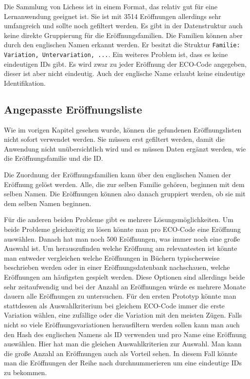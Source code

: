 Die Sammlung von Lichess ist in einem Format, das relativ gut für eine Lernanwendung geeignet ist. Sie ist mit 3514 Eröffnungen allerdings sehr umfangreich und sollte noch gefiltert werden. Es gibt in der Datenstruktur auch keine direkte Gruppierung für die Eröffnungsfamilien. Die Familien können aber durch den englischen Namen erkannt werden. Er besitzt die Struktur \lstinline{Familie: Variation, Untervariation, ...}. Ein weiteres Problem ist, dass es keine eindeutigen IDs gibt. Es wird zwar zu jeder Eröffnung der ECO-Code angegeben, dieser ist aber nicht eindeutig. Auch der englische Name erlaubt keine eindeutige Identifikation. 

\subsection{Angepasste Eröffnungsliste}
\label{cp:opening list}
Wie im vorigen Kapitel gesehen wurde, können die gefundenen Eröffnungslisten nicht sofort verwendet werden. Sie müssen erst gefiltert werden, damit die Anwendung nicht unübersichtlich wird und es müssen Daten ergänzt werden, wie die Eröffnungsfamilie und die ID.

Die Zuordnung der Eröffnungsfamilien kann über den englischen Namen der Eröffnung gelöst werden. Alle, die zur selben Familie gehören, beginnen mit dem selben Namen. Die Eröffnungen können also danach gruppiert werden, ob sie mit dem selben Namen beginnen.

Für die anderen beiden Probleme gibt es mehrere Lösungsmöglichkeiten. Um beide Probleme gleichzeitig zu lösen könnte man pro ECO-Code eine Eröffnung auswählen. Danach hat man noch 500 Eröffnungen, was immer noch eine große Auswahl ist. Um herauszufinden welche Eröffnung am relevantesten ist könnte man entweder vergleichen welche Eröffnungen in Büchern typischerweise beschrieben werden oder in einer Eröffnungsdatenbank nachschauen, welche Eröffnungen am häufigsten gespielt werden. Diese Optionen sind allerdings beide sehr zeitaufwendig und bei der Anzahl an Eröffnungen würde es mehrere Monate dauern alle Eröffnungen zu untersuchen. Für den ersten Prototyp könnte man stattdessen als Auswahlkriterium bei gleichem ECO-Code immer die erste Variation wählen, eine zufällige oder die Variation mit den meisten Zügen. Falls nicht so viele Eröffnungsvariationen herausfiltern werden sollen kann man auch den Hash des englischen Namens als ID verwenden und pro Name eine Eröffnung auswählen. Hier hat man die gleichen Auswahlkriterien zur Auswahl. Man kann die große Anzahl an Eröffnungen auch als Vorteil sehen. In diesem Fall könnte man die Eröffnungen der Reihe nach durchnummerieren um eine eindeutige IDs zu bekommen.
